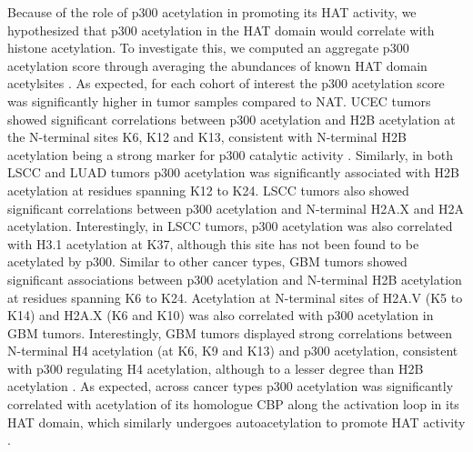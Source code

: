 Because of the role of p300 acetylation in promoting its HAT activity, we hypothesized that p300 acetylation in the HAT domain would correlate with histone acetylation. To investigate this, we computed an aggregate p300 acetylation score through averaging the abundances of known HAT domain acetylsites \cite{thompsonpr_colepa:RegulationP3002004}. As expected, for each cohort of interest the p300 acetylation score was significantly higher in tumor samples compared to NAT. UCEC tumors showed significant correlations between p300 acetylation and H2B acetylation at the N-terminal sites K6, K12 and K13, consistent with N-terminal H2B acetylation being a strong marker for p300 catalytic activity \cite{weinertbt_chunaramchoudhary:TimeResolvedAnalysis2018}. Similarly, in both LSCC and LUAD tumors p300 acetylation was significantly associated with H2B acetylation at residues spanning K12 to K24. LSCC tumors also showed significant correlations between p300 acetylation and N-terminal H2A.X and H2A acetylation. Interestingly, in LSCC tumors, p300 acetylation was also correlated with H3.1 acetylation at K37, although this site has not been found to be acetylated by p300. Similar to other cancer types, GBM tumors showed significant associations between p300 acetylation and N-terminal H2B acetylation at residues spanning K6 to K24. Acetylation at N-terminal sites of H2A.V (K5 to K14) and H2A.X (K6 and K10) was also correlated with p300 acetylation in GBM tumors. Interestingly, GBM tumors displayed strong correlations between N-terminal H4 acetylation (at K6, K9 and K13) and p300 acetylation, consistent with p300 regulating H4 acetylation, although to a lesser degree than H2B acetylation \cite{weinertbt_chunaramchoudhary:TimeResolvedAnalysis2018}. As expected, across cancer types p300 acetylation was significantly correlated with acetylation of its homologue CBP along the activation loop in its HAT domain, which similarly undergoes autoacetylation to promote HAT activity \cite{parks_wrightpe:RoleCBP2017}.

